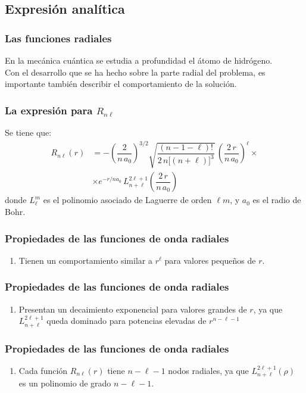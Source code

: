 \documentclass[12pt]{beamer}
\begin{document}
\subsection{Expresión analítica}

\begin{frame}
\frametitle{Las funciones radiales}
En la mecánica cuántica se estudia a profundidad el átomo de hidrógeno.
\\
\bigskip
\pause
Con el desarrollo que se ha hecho sobre la parte radial del problema, es importante también describir el comportamiento de la solución.
\end{frame}
\begin{frame}
\frametitle{La expresión para $R_{n \ell}$}
Se tiene que:
\pause
\begin{align*}
R_{n \ell} (r) &= - \left( \dfrac{2}{n \, a_{0}} \right)^{3/2} \sqrt{\dfrac{(n - 1 -\ell)!}{2 \, n \big[(n + \ell) \big]^{3}}} \, \left( \dfrac{2 \, r}{n \, a_{0}} \right)^{\ell} \times \\[0.5em]
&\times e^{-r/n a_{0}} \, L_{n+\ell}^{2 \ell+1} \left( \dfrac{2 \, r}{n \, a_{0}} \right)
\end{align*}
donde $L_{\ell}^{m}$ es el polinomio asociado de Laguerre de orden $\ell m$, y $a_{0}$ es el radio de Bohr.
\end{frame}
\begin{frame}
\frametitle{Propiedades de las funciones de onda radiales}
\begin{enumerate}[<+->]
\item Tienen un comportamiento similar a $r^{\ell}$ para valores pequeños de $r$.
\seti
\end{enumerate}
\end{frame}
\begin{frame}
\frametitle{Propiedades de las funciones de onda radiales}
\begin{enumerate}[<+->]
\conti   
\item Presentan un decaimiento exponencial para valores grandes de $r$, ya que $L_{n+\ell}^{2 \ell+1}$ queda dominado para potencias elevadas de $r^{n-\ell-1}$
\seti
\end{enumerate}
\end{frame}
\begin{frame}
\frametitle{Propiedades de las funciones de onda radiales}
\begin{enumerate}[<+->]
\conti
\item Cada función $R_{n \ell}(r)$ tiene $n-\ell-1$ nodos radiales, ya que $L_{n+\ell}^{2 \ell+1}(\rho)$ es un polinomio de grado $n - \ell - 1$.
\end{enumerate}
\end{frame}
\end{document}

